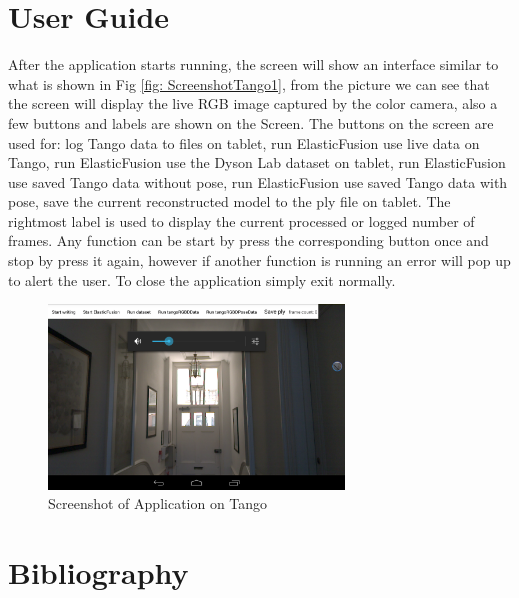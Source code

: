 \documentclass[12pt,twoside]{article}
\begin{document}
\section{User Guide}
After the application starts running, the screen will show an interface similar to what is shown in Fig \ref{fig: ScreenshotTango1}, from the picture we can see that the screen will display the live RGB image captured by the color camera, also a few buttons and labels are shown on the Screen. The buttons on the screen are used for: log Tango data to files on tablet, run ElasticFusion use live data on Tango, run ElasticFusion use the Dyson Lab dataset on tablet, run ElasticFusion use saved Tango data without pose, run ElasticFusion use saved Tango data with pose, save the current reconstructed model to the ply file on tablet. The rightmost label is used to display the current processed or logged number of frames. Any function can be start by press the corresponding button once and stop by press it again, however if another function is running an error will pop up to alert the user. To close the application simply exit normally.

\begin{figure}[h]
    \centering
    \includegraphics[width=0.7\textwidth]{figures/ScreenshotTango1}
    \caption{Screenshot of Application on Tango}
    \label{fig:ScreenshotTango1}
\end{figure}



\newpage




\section{Bibliography}





\end{document}
